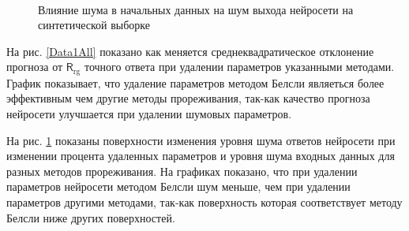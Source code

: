 \begin{figure}[h!t]\center
{}
\\
\caption{Влияние шума в начальных данных на шум выхода нейросети на синтетической выборке}
\label{Data1Noise}
\end{figure}

На рис. \ref{Data1All} показано как меняется среднеквадратическое отклонение прогноза от $\mathsf{R}_{\text{rg}}$ точного ответа при удалении параметров указанными методами. График показывает, что удаление параметров методом Белсли являеться более эффективным чем другие методы прореживания, так-как качество прогноза нейросети улучшается при удалении шумовых параметров.

На рис. \ref{Data1Noise} показаны поверхности изменения уровня шума ответов нейросети при изменении процента удаленных параметров и уровня шума входных данных для разных методов прореживания. На графиках показано, что при удалении параметров нейросети методом Белсли шум меньше, чем при удалении параметров другими методами, так-как поверхность которая соответствует методу Белсли ниже других поверхностей.


